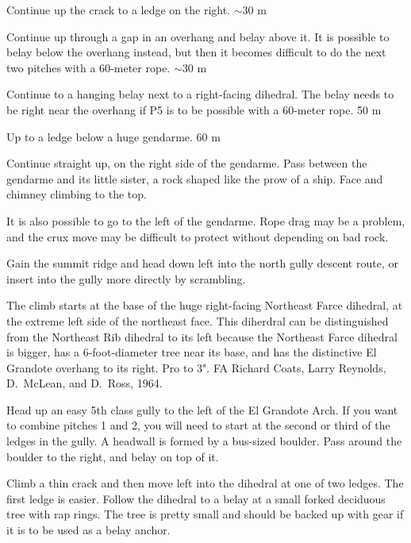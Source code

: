 \documentclass{tahquitz}
\begin{document}
 Continue up the crack to a ledge on the right.  $\sim 30$ m

 Continue up through a gap in an overhang and belay above it.
It is possible to belay below the overhang instead, but then it becomes
difficult to do the next two pitches with a 60-meter rope. $\sim 30$ m

 Continue to a hanging
belay next to a right-facing dihedral. The belay needs to be right near the
overhang if P5 is to be possible with a 60-meter rope. 50 m

 Up to a ledge below a huge gendarme. 60 m

 Continue straight up, on the right side of the gendarme.
Pass between the gendarme and its little sister, a rock shaped like
the prow of a ship. Face and chimney climbing to the top.

 It is also possible to go to the left of the gendarme.
Rope drag may be a problem, and the crux move may be difficult to protect
without depending on bad rock.

Gain the summit ridge and head down left into the north gully descent route,
or insert into the gully more directly by scrambling.





The climb starts at the base of the huge right-facing Northeast Farce dihedral,
at the extreme left side of the northeast face.
This diherdral can be distinguished from the Northeast Rib dihedral to its left
because the Northeast Farce dihedral is bigger, has a 6-foot-diameter tree near its base,
and has the distinctive El Grandote overhang to its right.
Pro to 3". FA Richard Coats, Larry Reynolds, D.~McLean, and D.~Ross, 1964.

 Head up an easy 5th class gully to the left of the El Grandote Arch.
If you want to combine pitches 1 and 2, you will need to start at the second or third
of the ledges in the gully. A headwall is formed by a bus-sized boulder. Pass around the boulder
to the right, and belay on top of it.

 Climb a thin crack and then move left into the dihedral at one of two ledges.
The first ledge is easier. Follow the dihedral to a belay at a small forked deciduous tree with rap
rings. The tree is pretty small and should be backed up with gear if it is to be
used as a belay anchor.
\end{document}
